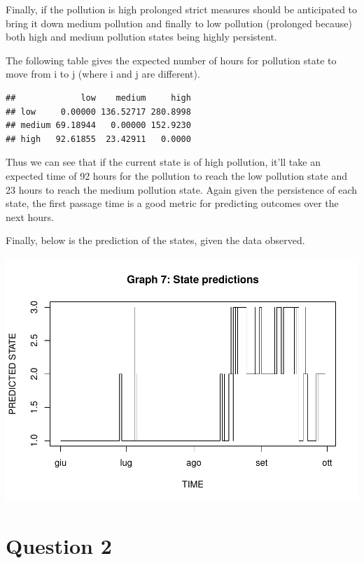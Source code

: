 \documentclass[
]{article}
\begin{document}
Finally, if the pollution is high prolonged strict measures should be
anticipated to bring it down medium pollution and finally to low
pollution (prolonged because) both high and medium pollution states
being highly persistent.

The following table gives the expected number of hours for pollution
state to move from i to j (where i and j are different).

\begin{verbatim}
##             low    medium     high
## low     0.00000 136.52717 280.8998
## medium 69.18944   0.00000 152.9230
## high   92.61855  23.42911   0.0000
\end{verbatim}

Thus we can see that if the current state is of high pollution, it'll
take an expected time of 92 hours for the pollution to reach the low
pollution state and 23 hours to reach the medium pollution state. Again
given the persistence of each state, the first passage time is a good
metric for predicting outcomes over the next hours.

Finally, below is the prediction of the states, given the data observed.

\begin{center}\includegraphics[width=1\linewidth,height=0.75\textheight]{finalproject_files/figure-latex/unnamed-chunk-2-1} \end{center}

\hypertarget{question-2}{%
\section{Question 2}\label{question-2}}
\end{document}
